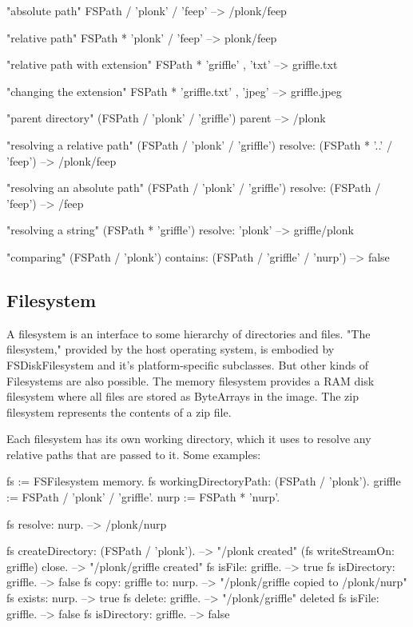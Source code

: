 \documentclass[a4paper,10pt,twoside]{book}
\begin{document}
\begin{code}{}
    "absolute path"
    FSPath / 'plonk' / 'feep'       --> /plonk/feep
    
    "relative path"
    FSPath * 'plonk' / 'feep'       --> plonk/feep

    "relative path with extension"
    FSPath * 'griffle' , 'txt'      --> griffle.txt
    
    "changing the extension"
    FSPath * 'griffle.txt' , 'jpeg'     --> griffle.jpeg
    
    "parent directory"
    (FSPath / 'plonk' / 'griffle') parent   --> /plonk
    
    "resolving a relative path"
    (FSPath / 'plonk' / 'griffle') resolve: (FSPath * '..' / 'feep')
                        --> /plonk/feep
    
    "resolving an absolute path"
    (FSPath / 'plonk' / 'griffle') resolve: (FSPath / 'feep')
                        --> /feep
                        
    "resolving a string"
    (FSPath * 'griffle') resolve: 'plonk'   --> griffle/plonk
                        
    "comparing"
    (FSPath / 'plonk') contains: (FSPath / 'griffle' / 'nurp')
                        --> false
\end{code}

\subsection{Filesystem}

A filesystem is an interface to some hierarchy of directories and files. "The filesystem," provided by the host operating system, is embodied by FSDiskFilesystem and it's platform-specific subclasses. But other kinds of Filesystems are also possible. The memory filesystem provides a RAM disk filesystem where all files are stored as ByteArrays in the image. The zip filesystem represents the contents of a zip file.

Each filesystem has its own working directory, which it uses to resolve any relative paths that are passed to it. Some examples:

\begin{code}{}
    fs := FSFilesystem memory.
    fs workingDirectoryPath: (FSPath / 'plonk').
    griffle := FSPath / 'plonk' / 'griffle'.
    nurp := FSPath * 'nurp'.
    
    fs resolve: nurp.            --> /plonk/nurp
    
    fs createDirectory: (FSPath / 'plonk').  --> "/plonk created"
    (fs writeStreamOn: griffle) close.  --> "/plonk/griffle created"
    fs isFile: griffle.         --> true
    fs isDirectory: griffle.         --> false
    fs copy: griffle to: nurp.       --> "/plonk/griffle copied to /plonk/nurp"
    fs exists: nurp.             --> true
    fs delete: griffle.          --> "/plonk/griffle" deleted
    fs isFile: griffle.          --> false
    fs isDirectory: griffle.         --> false
\end{code}
	
\end{document}
